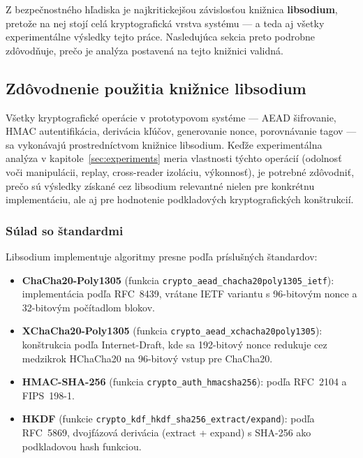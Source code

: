 \documentclass[journal,a4paper,onecolumn]{IEEEtran}
\begin{document}
\noindent Z bezpečnostného hľadiska je najkritickejšou závislosťou knižnica \textbf{libsodium}, pretože na nej stojí celá kryptografická vrstva systému --- a teda aj všetky experimentálne výsledky tejto práce. Nasledujúca sekcia preto podrobne zdôvodňuje, prečo je analýza postavená na tejto knižnici validná.

\subsection{Zdôvodnenie použitia knižnice libsodium}
\label{sec:libsodium_justification}

Všetky kryptografické operácie v prototypovom systéme --- AEAD šifrovanie, HMAC autentifikácia, derivácia kľúčov, generovanie nonce, porovnávanie tagov --- sa vykonávajú prostredníctvom knižnice libsodium\cite{LibsodiumDoc}. Keďže experimentálna analýza v kapitole~\ref{sec:experiments} meria vlastnosti týchto operácií (odolnosť voči manipulácii, replay, cross-reader izoláciu, výkonnosť), je potrebné zdôvodniť, prečo sú výsledky získané cez libsodium relevantné nielen pre konkrétnu implementáciu, ale aj pre hodnotenie podkladových kryptografických konštrukcií.

\subsubsection{Súlad so štandardmi}

Libsodium implementuje algoritmy presne podľa príslušných štandardov:

\begin{itemize}[leftmargin=*,itemsep=2pt]
  \item \textbf{ChaCha20-Poly1305} (funkcia \texttt{crypto\_aead\_chacha20poly1305\_ietf}): implementácia podľa RFC~8439\cite{RFC8439}, vrátane IETF variantu s 96-bitovým nonce a 32-bitovým počítadlom blokov.
  \item \textbf{XChaCha20-Poly1305} (funkcia \texttt{crypto\_aead\_xchacha20poly1305}): konštrukcia podľa Internet-Draft\cite{XChaChaDraft}, kde sa 192-bitový nonce redukuje cez medzikrok HChaCha20\cite{Bernstein2012} na 96-bitový vstup pre ChaCha20.
  \item \textbf{HMAC-SHA-256} (funkcia \texttt{crypto\_auth\_hmacsha256}): podľa RFC~2104\cite{RFC2104} a FIPS~198-1\cite{FIPS1981}.
  \item \textbf{HKDF} (funkcie \texttt{crypto\_kdf\_hkdf\_sha256\_extract/expand}): podľa RFC~5869\cite{RFC5869}, dvojfázová derivácia (extract + expand) s SHA-256 ako podkladovou hash funkciou.
\end{itemize}
\end{document}
